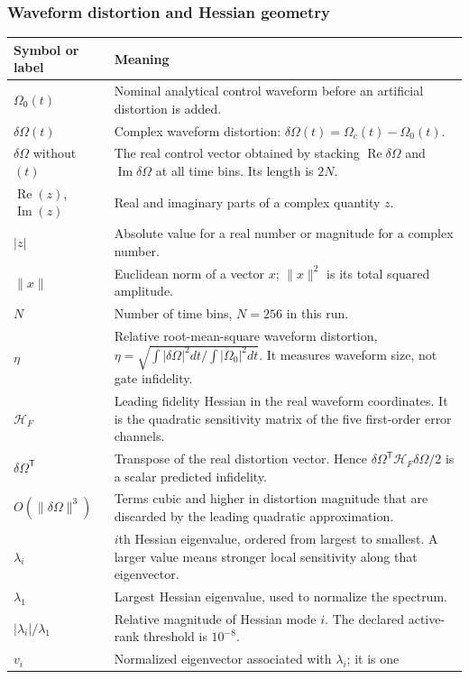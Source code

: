 \documentclass[11pt]{article}
\newcommand{\Om}{\Omega}
\newcommand{\dOm}{\delta\Omega}
\newcommand{\Hess}{\mathcal{H}_{F}}
\begin{document}
\subsubsection{Waveform distortion and Hessian geometry}

\begin{longtable}{p{}p{}}
\toprule
Symbol or label & Meaning\\
\midrule
\endhead
$\Om_0(t)$ & Nominal analytical control waveform before an artificial
distortion is added.\\
$\dOm(t)$ & Complex waveform distortion:
$\dOm(t)=\Om_c(t)-\Om_0(t)$.\\
$\dOm$ without $(t)$ & The real control vector obtained by stacking
$\operatorname{Re}\dOm$ and $\operatorname{Im}\dOm$ at all time bins.  Its
length is $2N$.\\
$\operatorname{Re}(z)$, $\operatorname{Im}(z)$ & Real and imaginary parts of
a complex quantity $z$.\\
$|z|$ & Absolute value for a real number or magnitude for a complex number.\\
$\|x\|$ & Euclidean norm of a vector $x$; $\|x\|^2$ is its total squared
amplitude.\\
$N$ & Number of time bins, $N=256$ in this run.\\
$\eta$ & Relative root-mean-square waveform distortion,
$\eta=\sqrt{\int|\dOm|^2dt/\int|\Om_0|^2dt}$.  It measures waveform size,
not gate infidelity.\\
$\Hess$ & Leading fidelity Hessian in the real waveform coordinates.  It is
the quadratic sensitivity matrix of the five first-order error channels.\\
$\dOm^{\mathsf T}$ & Transpose of the real distortion vector.  Hence
$\dOm^{\mathsf T}\Hess\dOm/2$ is a scalar predicted infidelity.\\
$O(\|\dOm\|^3)$ & Terms cubic and higher in distortion magnitude that are
discarded by the leading quadratic approximation.\\
$\lambda_i$ & $i$th Hessian eigenvalue, ordered from largest to smallest.  A
larger value means stronger local sensitivity along that eigenvector.\\
$\lambda_1$ & Largest Hessian eigenvalue, used to normalize the spectrum.\\
$|\lambda_i|/\lambda_1$ & Relative magnitude of Hessian mode $i$.  The
declared active-rank threshold is $10^{-8}$.\\
$v_i$ & Normalized eigenvector associated with $\lambda_i$; it is one

\end{longtable}
\end{document}
